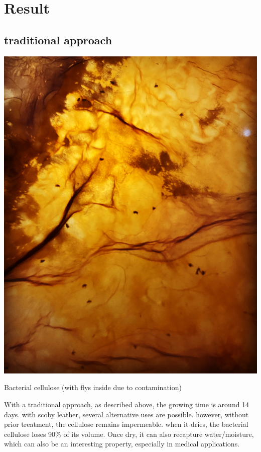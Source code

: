 \section{Result}

\subsection{traditional approach}


\begin{marginfigure}
    \centering
    \includegraphics{images/kombujolie.JPG}
    \caption{Bacterial cellulose (with flys inside due to contamination)}
    \label{fig:fogger}
\end{marginfigure}

With a traditional approach, as described above, the growing time is around 14 days. with scoby leather, several alternative uses are possible. however, without prior treatment, the cellulose remains impermeable. when it dries, the bacterial cellulose loses 90\% of its volume. Once dry, it can also recapture water/moisture, which can also be an interesting property, especially in medical applications.   

